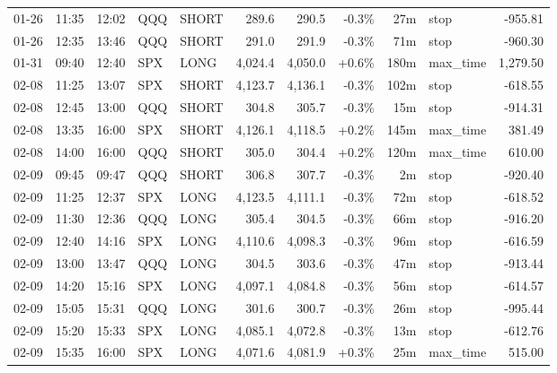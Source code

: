 \documentclass[11pt,a4paper,twoside]{article}
\begin{document}
\begin{center}
\begin{longtable}{>{\color{txtmain}}l l l l l r r r r >{\color{txtmain}}l r}
01-26 & 11:35 & 12:02 & QQQ & SHORT & 289.6 & 290.5 & \textcolor{lossred}{-0.3\%} & 27m & stop & \textcolor{lossred}{-955.81} \\
01-26 & 12:35 & 13:46 & QQQ & SHORT & 291.0 & 291.9 & \textcolor{lossred}{-0.3\%} & 71m & stop & \textcolor{lossred}{-960.30} \\
01-31 & 09:40 & 12:40 & SPX & LONG & 4,024.4 & 4,050.0 & \textcolor{wingreen}{+0.6\%} & 180m & max\_time & \textcolor{wingreen}{1,279.50} \\
02-08 & 11:25 & 13:07 & SPX & SHORT & 4,123.7 & 4,136.1 & \textcolor{lossred}{-0.3\%} & 102m & stop & \textcolor{lossred}{-618.55} \\
02-08 & 12:45 & 13:00 & QQQ & SHORT & 304.8 & 305.7 & \textcolor{lossred}{-0.3\%} & 15m & stop & \textcolor{lossred}{-914.31} \\
02-08 & 13:35 & 16:00 & SPX & SHORT & 4,126.1 & 4,118.5 & \textcolor{wingreen}{+0.2\%} & 145m & max\_time & \textcolor{wingreen}{381.49} \\
02-08 & 14:00 & 16:00 & QQQ & SHORT & 305.0 & 304.4 & \textcolor{wingreen}{+0.2\%} & 120m & max\_time & \textcolor{wingreen}{610.00} \\
02-09 & 09:45 & 09:47 & QQQ & SHORT & 306.8 & 307.7 & \textcolor{lossred}{-0.3\%} & 2m & stop & \textcolor{lossred}{-920.40} \\
02-09 & 11:25 & 12:37 & SPX & LONG & 4,123.5 & 4,111.1 & \textcolor{lossred}{-0.3\%} & 72m & stop & \textcolor{lossred}{-618.52} \\
02-09 & 11:30 & 12:36 & QQQ & LONG & 305.4 & 304.5 & \textcolor{lossred}{-0.3\%} & 66m & stop & \textcolor{lossred}{-916.20} \\
02-09 & 12:40 & 14:16 & SPX & LONG & 4,110.6 & 4,098.3 & \textcolor{lossred}{-0.3\%} & 96m & stop & \textcolor{lossred}{-616.59} \\
02-09 & 13:00 & 13:47 & QQQ & LONG & 304.5 & 303.6 & \textcolor{lossred}{-0.3\%} & 47m & stop & \textcolor{lossred}{-913.44} \\
02-09 & 14:20 & 15:16 & SPX & LONG & 4,097.1 & 4,084.8 & \textcolor{lossred}{-0.3\%} & 56m & stop & \textcolor{lossred}{-614.57} \\
02-09 & 15:05 & 15:31 & QQQ & LONG & 301.6 & 300.7 & \textcolor{lossred}{-0.3\%} & 26m & stop & \textcolor{lossred}{-995.44} \\
02-09 & 15:20 & 15:33 & SPX & LONG & 4,085.1 & 4,072.8 & \textcolor{lossred}{-0.3\%} & 13m & stop & \textcolor{lossred}{-612.76} \\
02-09 & 15:35 & 16:00 & SPX & LONG & 4,071.6 & 4,081.9 & \textcolor{wingreen}{+0.3\%} & 25m & max\_time & \textcolor{wingreen}{515.00} \\

\end{longtable}
\end{center}
\end{document}
